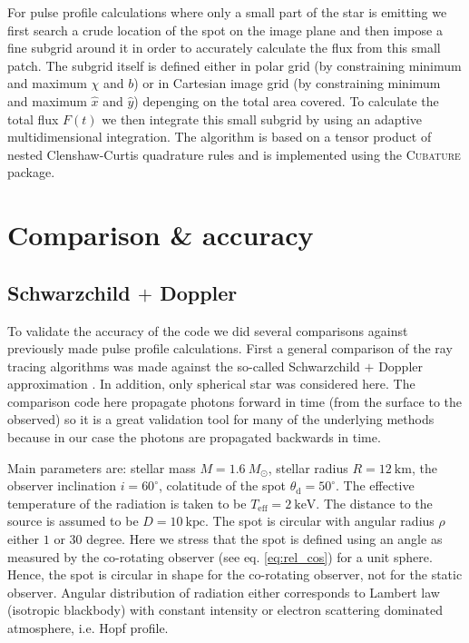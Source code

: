 \documentclass[iop, usenatbib]{emulateapj}
\newcommand{\Msun}{\ensuremath{M_{\odot}}}
\begin{document}
For pulse profile calculations where only a small part of the star is emitting we first search a crude location of the spot on the image plane and then impose a fine subgrid around it in order to accurately calculate the flux from this small patch.
The subgrid itself is defined either in polar grid (by constraining minimum and maximum $\chi$ and $b$) or in Cartesian image grid (by constraining minimum and maximum $\hat{x}$ and $\hat{y}$) depenging on the total area covered.
To calculate the total flux $F(t)$ we then integrate this small subgrid by using an adaptive multidimensional integration.
The algorithm is based on a tensor product of nested Clenshaw-Curtis quadrature rules and is implemented using the \textsc{Cubature} package.



\section{Comparison \& accuracy}

\subsection{Schwarzchild $+$ Doppler}

To validate the accuracy of the code we did several comparisons against previously made pulse profile calculations.
First a general comparison of the ray tracing algorithms was made against the so-called Schwarzchild $+$ Doppler approximation \citep[see e.g.][]{PB06}.
In addition, only spherical star was considered here.
The comparison code here propagate photons forward in time (from the surface to the observed) so it is a great validation tool for many of the underlying methods because in our case the photons are propagated backwards in time.

Main parameters are: stellar mass $M = 1.6~\Msun$, stellar radius $R = 12~\mathrm{km}$, the observer inclination $i = 60^{\circ}$, colatitude of the spot $\theta_{\mathrm{d}} = 50^{\circ}$.
The effective temperature of the radiation is taken to be $T_{\mathrm{eff}} = 2~\mathrm{keV}$. 
The distance to the source is assumed to be $D = 10~\mathrm{kpc}$.
The spot is circular with angular radius $\rho$ either $1$ or $30$ degree.
Here we stress that the spot is defined using an angle as measured by the co-rotating observer (see eq. \eqref{eq:rel_cos}) for a unit sphere.
Hence, the spot is circular in shape for the co-rotating observer, not for the static observer.
Angular distribution of radiation either corresponds to Lambert law (isotropic blackbody) with constant intensity or electron scattering dominated atmosphere, i.e. Hopf profile.
\end{document}
